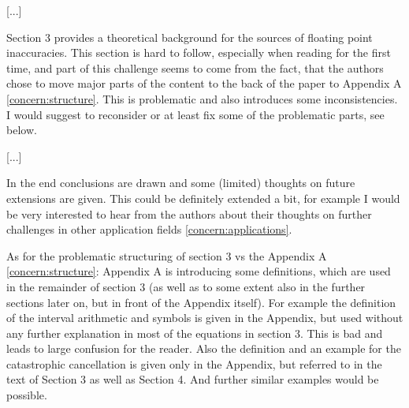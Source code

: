 \documentclass{article}
\begin{document}


[...]

Section 3 provides a theoretical background for the sources of floating point inaccuracies.
This section is hard to follow, especially when reading for the first time, and part of this challenge seems to come from the fact, that the authors chose to move major parts of the content to the back of the paper to Appendix A \eqref{concern:structure}.
This is problematic and also introduces some inconsistencies.
I would suggest to reconsider or at least fix some of the problematic parts, see below.



[...]

In the end conclusions are drawn and some (limited) thoughts on future extensions are given.
This could be definitely extended a bit, for example I would be very interested to hear from the authors about their thoughts on further challenges in other application fields \eqref{concern:applications}.

As for the problematic structuring of section 3 vs the Appendix A \eqref{concern:structure}: 
Appendix A is introducing some definitions, which are used in the remainder of section 3 (as well as to some extent also in the further sections later on, but in front of the Appendix itself). 
For example the definition of the interval arithmetic and symbols is given in the Appendix, but used without any further explanation in most of the equations in section 3.
This is bad and leads to large confusion for the reader.
Also the definition and an example for the catastrophic cancellation is given only in the Appendix, but referred to in the text of Section 3 as well as Section 4.
And further similar examples would be possible.
\end{document}
